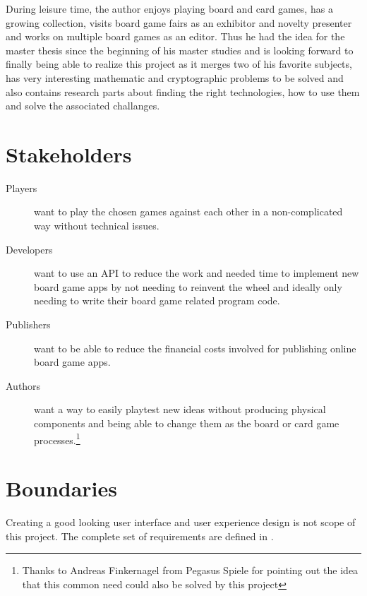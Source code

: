 During leisure time, the author enjoys playing board and card games, has a
growing collection, visits board game fairs as an exhibitor and novelty
presenter and works on multiple board games as an editor. Thus he had the idea
for the master thesis since the beginning of his master studies and is looking
forward to finally being able to realize this project as it merges two of his
favorite subjects, has very interesting mathematic and cryptographic problems to
be solved and also contains research parts about finding the right
technologies, how to use them and solve the associated challanges.

\section{Stakeholders}

\begin{description}
  \item[Players] want to play the chosen games against each other in a
  non-complicated way without technical issues.
  \item[Developers] want to use an API to reduce the work and needed time to
  implement new board game apps by not needing to reinvent the wheel and ideally
  only needing to write their board game related program code.
  \item[Publishers] want to be able to reduce the financial costs
  involved for publishing online board game apps.
  \item[Authors] want a way to easily playtest new ideas without producing
  physical components and being able to change them as the board or card game
  processes.\footnote{Thanks to Andreas Finkernagel from Pegasus Spiele for
  pointing out the idea that this common need could also be solved by this
  project}
\end{description}

\section{Boundaries}

Creating a good looking user interface and user experience design is not scope
of this project. The complete set of requirements are defined in
.
